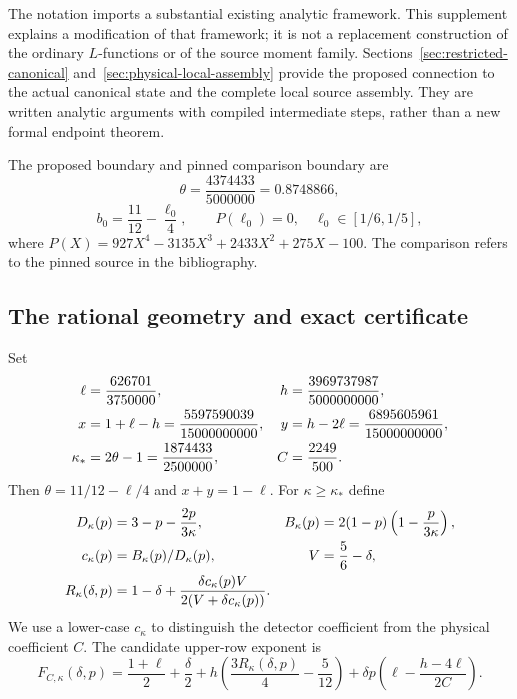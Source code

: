 The notation imports a substantial existing analytic framework. This
supplement explains a modification of that framework; it is not a replacement
construction of the ordinary $L$-functions or of the source moment family.
Sections~\ref{sec:restricted-canonical} and~\ref{sec:physical-local-assembly}
provide the proposed connection to the actual canonical state and the
complete local source assembly. They are written analytic arguments with
compiled intermediate steps, rather than a new formal endpoint theorem.



The proposed boundary and pinned comparison boundary are
\begin{equation}\label{eq:theta}
 \theta=\frac{4374433}{5000000}=0.8748866,
\end{equation}
\begin{equation}\label{eq:quartic}
 b_0=\frac{11}{12}-\frac{\ell_0}{4},\qquad
 P(\ell_0)=0,\quad \ell_0\in[1/6,1/5],
\end{equation}
where $P(X)=927X^4-3135X^3+2433X^2+275X-100$.
The comparison refers to the pinned source in the bibliography.
\subsection{The rational geometry and exact certificate}
Set
\begin{align}\label{eq:geometry}
 \ell&=\frac{626701}{3750000}, &
 h&=\frac{3969737987}{5000000000},\notag\\
 x&=1+\ell-h=\frac{5597590039}{15000000000}, &
 y&=h-2\ell=\frac{6895605961}{15000000000},\notag\\
 \kappa_*&=2\theta-1=\frac{1874433}{2500000}, &
 C&=\frac{2249}{500}.
\end{align}
Then $\theta=11/12-\ell/4$ and $x+y=1-\ell$.
For $\kappa\ge\kappa_*$ define
\begin{align}\label{eq:detector}
 D_\kappa(p)&=3-p-\frac{2p}{3\kappa}, &
 B_\kappa(p)&=2(1-p)\left(1-\frac{p}{3\kappa}\right),\notag\\
 c_\kappa(p)&=B_\kappa(p)/D_\kappa(p), &
 V&=\frac56-\delta,\notag\\
 R_\kappa(\delta,p)&=1-\delta+
       \frac{\delta c_\kappa(p)V}{2(V+\delta c_\kappa(p))}.
\end{align}
We use a lower-case $c_\kappa$ to distinguish the detector coefficient
from the physical coefficient $C$. The candidate upper-row exponent is
\begin{equation}\label{eq:F}
 F_{C,\kappa}(\delta,p)=\frac{1+\ell}{2}+\frac\delta2
 +h\left(\frac{3R_\kappa(\delta,p)}4-\frac5{12}\right)
 +\delta p\left(\ell-\frac{h-4\ell}{2C}\right).
\end{equation}

